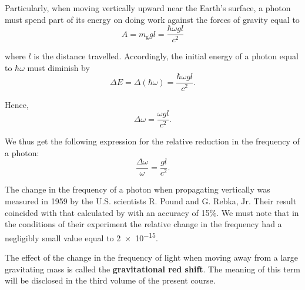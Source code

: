 \noindent
Particularly, when moving vertically upward near the Earth's surface, a photon must spend part of its energy on doing work against the forces of gravity equal to
\begin{equation*}
	A = m_{\text{g}} gl = \frac{\hbar\omega gl}{c^2}
\end{equation*}

\noindent
where $l$ is the distance travelled. Accordingly, the initial energy of a photon equal to $\hbar\omega$ must diminish by
\begin{equation*}
	\Delta E = \Delta(\hbar\omega) = \frac{\hbar\omega gl}{c^2}.
\end{equation*}

\noindent
Hence,
\begin{equation*}
	\Delta\omega = \frac{\omega gl}{c^2}.
\end{equation*}

\noindent
We thus get the following expression for the relative reduction in the frequency of a photon:
\begin{equation}\label{eq:8_61}
	\frac{\Delta\omega}{\omega} = \frac{gl}{c^2}.
\end{equation}

The change in the frequency of a photon when propagating vertically was measured in 1959 by the U.S. scientists R. Pound and G. Rebka, Jr. Their result coincided with that calculated by  with an accuracy of 15\%. We must note that in the conditions of their experiment the relative change in the frequency had a negligibly small value equal to \num{2e-15}.

The effect of the change in the frequency of light when moving away from a large gravitating mass is called the \textbf{gravitational red shift}. The meaning of this term will be disclosed in the third volume of the present course.